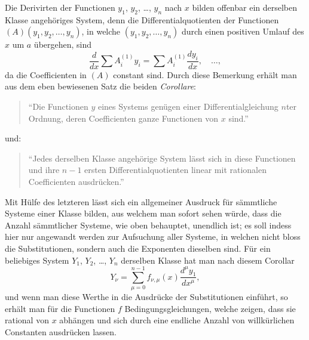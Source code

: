 \documentclass[12pt,a4paper]{article}
\begin{document}
Die Derivirten der Functionen $y_1$, $y_2$, \ldots, $y_n$ nach $x$ bilden offenbar ein derselben Klasse angeh\"origes System, denn die Differentialquotienten der Functionen $(A)(y_1, y_2, \ldots, y_n)$, in welche $(y_1, y_2, \ldots, y_n)$ durch einen positiven Umlauf des $x$ um $a$ \"ubergehen, sind
\[
\frac{d}{dx}\sum A_i^{(1)}y_i = \sum A_i^{(1)}\frac{dy_i}{dx}, \quad \ldots,
\]
da die Coefficienten in $(A)$ constant sind. Durch diese Bemerkung erh\"alt man aus dem eben bewiesenen Satz die beiden \emph{Corollare}:

\begin{quote}
``Die Functionen $y$ eines Systems gen\"ugen einer Differentialgleichung $n$ter Ordnung, deren Coefficienten ganze Functionen von $x$ sind.''
\end{quote}
und:
\begin{quote}
``Jedes derselben Klasse angeh\"orige System l\"asst sich in diese Functionen und ihre $n-1$ ersten Differentialquotienten linear mit rationalen Coefficienten ausdr\"ucken.''
\end{quote}

Mit H\"ulfe des letzteren l\"asst sich ein allgemeiner Ausdruck f\"ur s\"ammtliche Systeme einer Klasse bilden, aus welchem man sofort sehen w\"urde, dass die Anzahl s\"ammtlicher Systeme, wie oben behauptet, unendlich ist; es soll indess hier nur angewandt werden zur Aufsuchung aller Systeme, in welchen nicht bloss die Substitutionen, sondern auch die Exponenten dieselben sind. F\"ur ein beliebiges System $Y_1$, $Y_2$, \ldots, $Y_n$ derselben Klasse hat man nach diesem Corollar
\[
Y_\nu = \sum_{\mu=0}^{n-1} f_{\nu,\mu}(x) \frac{d^\mu y_1}{dx^\mu},
\]
und wenn man diese Werthe in die Ausdr\"ucke der Substitutionen einf\"uhrt, so erh\"alt man f\"ur die Functionen $f$ Bedingungsgleichungen, welche zeigen, dass sie rational von $x$ abh\"angen und sich durch eine endliche Anzahl von willk\"urlichen Constanten ausdr\"ucken lassen.

\newpage
\end{document}
